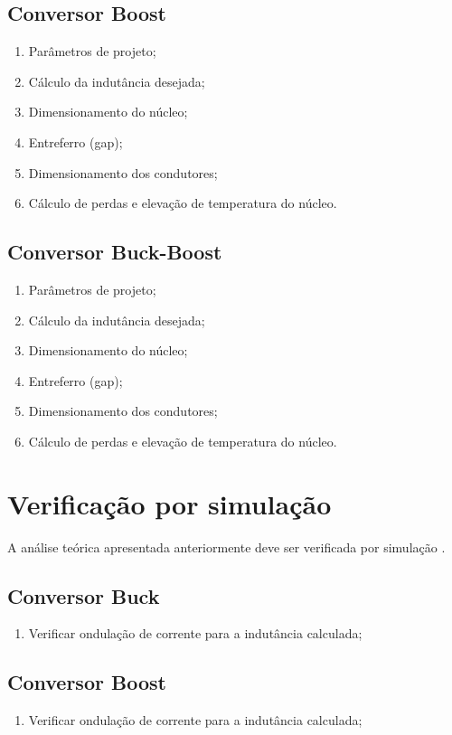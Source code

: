 \subsection{Conversor Boost}
\begin{enumerate}	
	\item Parâmetros de projeto; 	
	\item Cálculo da indutância desejada;	
	\item Dimensionamento do núcleo;	
	\item Entreferro (gap);
	\item  Dimensionamento dos condutores;
	\item Cálculo de perdas e elevação de temperatura do núcleo.
\end{enumerate}

\subsection{Conversor Buck-Boost}
\begin{enumerate}	
	\item Parâmetros de projeto; 	
	\item Cálculo da indutância desejada;	
	\item Dimensionamento do núcleo;	
	\item Entreferro (gap);
	\item  Dimensionamento dos condutores;
	\item Cálculo de perdas e elevação de temperatura do núcleo.
\end{enumerate}

\section{Verificação por simulação}


A análise teórica apresentada anteriormente deve ser verificada por simulação \cite{noauthor_psim_nodate}. 
 
\subsection{Conversor Buck}
\begin{enumerate}	
	\item Verificar ondulação de corrente para a indutância calculada; 	
\end{enumerate}

\subsection{Conversor Boost}
\begin{enumerate}	
	\item Verificar ondulação de corrente para a indutância calculada; 	
\end{enumerate}

